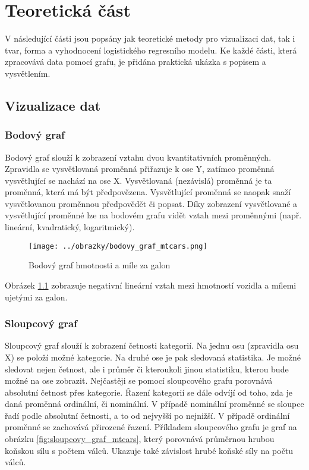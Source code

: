 \chapter{Teoretická část}
V následující části jsou popsány jak teoretické metody pro vizualizaci dat, tak i tvar, forma a vyhodnocení logistického regresního modelu. 
Ke každé části, která zpracovává data pomocí grafu, je přidána praktická ukázka s popisem a vysvětlením.

\section{Vizualizace dat} \label{sec:vizualizace_dat}
\subsection{Bodový graf}
Bodový graf slouží k zobrazení vztahu dvou kvantitativních proměnných. Zpravidla se vysvětlovaná proměnná přiřazuje k ose Y,
zatímco proměnná vysvětlující se nachází na ose X. Vysvětlovaná (nezávislá) proměnná je ta proměnná, která má být předpovězena.
Vysvětlující proměnná se naopak snaží vysvětlovanou proměnnou předpovědět či popsat. Díky zobrazení vysvětlované a vysvětlující proměnné lze na
bodovém grafu vidět vztah mezi proměnnými (např. lineární, kvadratický, logaritmický).
  
\begin{figure}[H]
    \centering
    \texttt{[image: ../obrazky/bodovy\_graf\_mtcars.png]}
    \caption{Bodový graf hmotnosti a míle za galon} 
    \label{fig:bodovy_graf_mtcars}
\end{figure}

Obrázek \ref{fig:bodovy_graf_mtcars} zobrazuje negativní lineární vztah mezi hmotností vozidla a mílemi ujetými za galon.

\subsection{Sloupcový graf}
Sloupcový graf slouží k zobrazení četnosti kategorií. Na jednu osu (zpravidla osu X) se položí možné kategorie. Na druhé ose je pak sledovaná statistika. Je možné sledovat 
nejen četnost, ale i průměr či kteroukoli jinou statistiku, kterou bude možné na ose zobrazit. Nejčastěji se pomocí sloupcového grafu porovnává absolutní četnost přes kategorie.
Řazení kategorií se dále odvíjí od toho, zda je daná proměnná ordinální, či nominální. V případě nominální proměnné se sloupce řadí podle absolutní četnosti, a to od nejvyšší po
nejnižší. V případě ordinální proměnné se zachovává přirozené řazení. Příkladem sloupcového grafu je graf na obrázku \ref{fig:sloupcovy_graf_mtcars}, který porovnává průměrnou
hrubou koňskou sílu s počtem válců. Ukazuje také závislost hrubé koňské síly na počtu válců.

